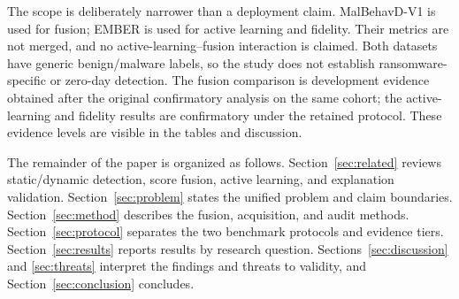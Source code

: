The scope is deliberately narrower than a deployment claim. MalBehavD-V1 is
used for fusion; EMBER is used for active learning and fidelity. Their metrics
are not merged, and no active-learning--fusion interaction is claimed. Both
datasets have generic benign/malware labels, so the study does not establish
ransomware-specific or zero-day detection. The fusion comparison is development
evidence obtained after the original confirmatory analysis on the same cohort;
the active-learning and fidelity results are confirmatory under the retained
protocol. These evidence levels are visible in the tables and discussion.

The remainder of the paper is organized as follows.
Section~\ref{sec:related} reviews static/dynamic detection, score fusion, active
learning, and explanation validation. Section~\ref{sec:problem} states the
unified problem and claim boundaries. Section~\ref{sec:method} describes the
fusion, acquisition, and audit methods. Section~\ref{sec:protocol} separates the
two benchmark protocols and evidence tiers. Section~\ref{sec:results} reports
results by research question. Sections~\ref{sec:discussion} and
\ref{sec:threats} interpret the findings and threats to validity, and
Section~\ref{sec:conclusion} concludes.
